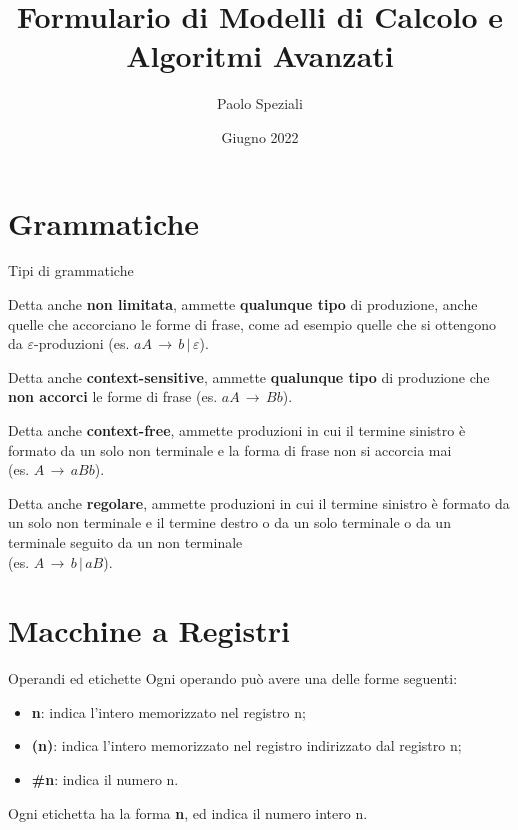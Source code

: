 \documentclass[10pt,a4paper]{article}
\title{Formulario di Modelli di Calcolo e Algoritmi Avanzati}
\author{Paolo Speziali}
\date{Giugno 2022}
\begin{document}
\small
\begin{multicols}{3}

\maketitle
\thispagestyle{empty}


\section{Grammatiche}


\begin{textbox}{Tipi di grammatiche}

Detta anche \textbf{non limitata}, ammette \textbf{qualunque tipo}
di produzione, anche quelle che accorciano le forme di
frase, come ad esempio quelle che si ottengono da \(\varepsilon\)-produzioni
(es. \(aA\,\rightarrow\,b\,|\,\varepsilon\)).

Detta anche \textbf{context-sensitive}, ammette \textbf{qualunque tipo}
di produzione che \textbf{non accorci} le forme di frase
(es. \(aA\,\rightarrow\,Bb\)).

Detta anche \textbf{context-free}, ammette produzioni in cui
il termine sinistro è formato da un solo non terminale
e la forma di frase non si accorcia mai \\
(es. \(A\,\rightarrow\,aBb\)).

Detta anche \textbf{regolare}, ammette produzioni in cui
il termine sinistro è formato da un solo non terminale
e il termine destro o da un solo terminale o da un
terminale seguito da un non terminale\\
(es. \(A\,\rightarrow\,b\,|\,aB\)).

\end{textbox}

\section{Macchine a Registri}

\begin{textbox}{Operandi ed etichette}
Ogni operando  può avere una delle forme seguenti:
\begin{itemize}[leftmargin=*]
    \item \textbf{n}:  indica l’intero memorizzato nel registro n;
    \item \textbf{(n)}:  indica l’intero memorizzato nel registro indirizzato dal
    registro n;
    \item \textbf{\#n}:  indica il numero n.
\end{itemize}
Ogni etichetta  ha la forma \textbf{n}, ed indica il numero intero n.
\end{textbox}


\end{multicols}
\end{document}
